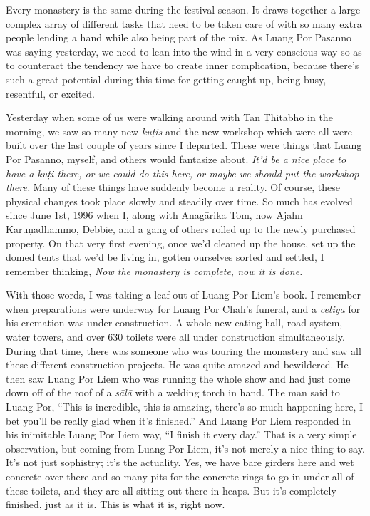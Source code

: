 Every monastery is the same during the festival season. It draws 
together a large complex array of different tasks that need to be taken 
care of with so many extra people lending a hand while also being part 
of the mix. As Luang Por Pasanno was saying yesterday, we need to lean 
into the wind in a very conscious way so as to counteract the tendency 
we have to create inner complication, because there's such a great 
potential during this time for getting caught up, being busy, 
resentful, or excited.

Yesterday when some of us were walking around with Tan Ṭhitābho in 
the morning, we saw so many new \emph{kuṭis} and the new workshop 
which were all were built over the last couple of years since I 
departed. These were things that Luang Por Pasanno, myself, and others 
would fantasize about. \emph{It'd be a nice place to have a kuṭi 
there, or we could do this here, or maybe we should put the workshop 
there.} Many of these things have suddenly become a reality. Of course, 
these physical changes took place slowly and steadily over time. So 
much has evolved since June 1st, 1996 when I, along with Anagārika 
Tom, now Ajahn Karuṇadhammo, Debbie, and a gang of others rolled up 
to the newly purchased property. On that very first evening, once we'd 
cleaned up the house, set up the domed tents that we'd be living in, 
gotten ourselves sorted and settled, I remember thinking, \emph{Now the 
monastery is complete, now it is done.}

With those words, I was taking a leaf out of Luang Por Liem's book. I 
remember when preparations were underway for Luang Por Chah's funeral, 
and a \emph{cetiya} for his cremation was under construction. A whole 
new eating hall, road system, water towers, and over 630 toilets were 
all under construction simultaneously. During that time, there was 
someone who was touring the monastery and saw all these different 
construction projects. He was quite amazed and bewildered. He then saw 
Luang Por Liem who was running the whole show and had just come down 
off of the roof of a \emph{sālā} with a welding torch in hand. The 
man said to Luang Por, ``This is incredible, this is amazing, there's 
so much happening here, I bet you'll be really glad when it's 
finished.'' And Luang Por Liem responded in his inimitable Luang Por 
Liem way, ``I finish it every day.'' That is a very simple observation, 
but coming from Luang Por Liem, it's not merely a nice thing to say. 
It's not just sophistry; it's the actuality. Yes, we have bare girders 
here and wet concrete over there and so many pits for the concrete 
rings to go in under all of these toilets, and they are all sitting out 
there in heaps. But it's completely finished, just as it is. This is 
what it is, right now.

